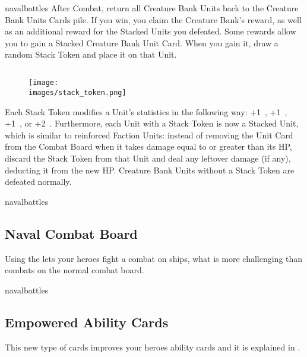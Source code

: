 \begin{multicols*}{2}
\begin{expansion}[before=\vspace*{-11mm}]{navalbattles}
  After Combat, return all Creature Bank Units back to the Creature Bank Units Cards pile.
  If you win, you claim the Creature Bank's reward, as well as an additional reward for the Stacked Units you defeated.
  Some rewards allow you to gain a Stacked Creature Bank Unit Card.
  When you gain it, draw a random Stack Token and place it on that Unit.

  \subsection*{}
  \setlength\intextsep{0pt}
  \setlength\columnsep{1em}
  \begin{wrapfigure}{r}{0.2\linewidth}
    \texttt{[image: \\images/stack\_token.png]}
  \end{wrapfigure}
  Each Stack Token modifies a Unit's statistics in the following way: +1~, +1~, +1~, or +2~.
  Furthermore, each Unit with a Stack Token is now a Stacked Unit, which is similar to reinforced Faction Units: instead of removing the Unit Card from the Combat Board when it takes damage equal to or greater than its HP, discard the Stack Token from that Unit and deal any leftover damage (if any), deducting it from the new HP.
  Creature Bank Units without a Stack Token are defeated normally.
\end{expansion}

\bigskip

\begin{expansion}{navalbattles}
  \subsection*{Naval Combat Board}
  Using the  lets your heroes fight a combat on ships, what is more challenging than combats on the normal combat board.
\end{expansion}

\vspace*{1em}
\begin{expansion}{navalbattles}
  \subsection*{Empowered Ability Cards}
  This new type of cards improves your heroes ability cards and it is explained in .
\end{expansion}


\end{multicols*}
